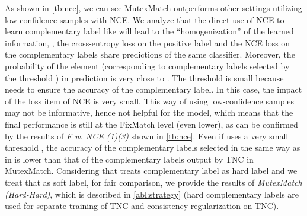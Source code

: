 \documentclass[lettersize,journal]{IEEEtran}
\theoremstyle{plain}
\theoremstyle{definition}
\theoremstyle{remark}
\begin{document}
As shown  in \cref{tb:nce}, we can see MutexMatch outperforms other settings utilizing low-confidence samples with NCE. We analyze that the direct use of NCE to learn complementary label like \cite{rizve2021in} will lead to the ``homogenization'' of the learned information, \ie, the cross-entropy loss on the positive label and the NCE loss on the complementary labels share predictions of the same classifier. Moreover, the probability of the element (corresponding to complementary labels selected by the threshold ) in prediction is very close to . The threshold  is small because \cite{rizve2021in} needs to ensure the accuracy of the complementary label. In this case, the impact of the loss item of NCE is very small. This way of using low-confidence samples may not be informative, hence not helpful for the model, which means that the final performance is still at the FixMatch level (even lower), as can be confirmed by the results of \textit{F w. NCE (1)(3)} shown  in \cref{tb:nce}. Even if \cite{rizve2021in} uses a very small threshold , the accuracy of the complementary labels selected in the same way as in \cite{rizve2021in} is lower than that of the complementary labels output by TNC in MutexMatch. Considering that \cite{rizve2021in} treats complementary label as hard label and we treat that as soft label, for fair comparison, we provide the results of \textit{MutexMatch (Hard-Hard)}, which is described in \cref{abl:strategy} (hard complementary labels are used for separate training of TNC and consistency regularization on TNC).

 \begin{table}[t]
\centering
   \footnotesize


   \caption{Ablation study on CIFAR-10 with 40 labels, which is corresponding to the settings of () and () in \cref{sec:uls}. CPA indicates complementary pseudo-label accuracy. } 
   \vskip 0in
   \label{tb:nce}
\vskip 0in
   \end{table}    
\end{document}
